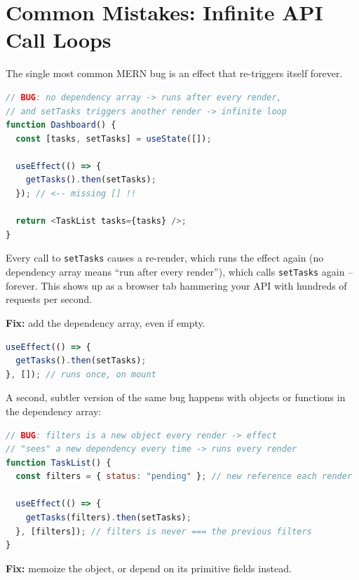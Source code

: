 \section{Common Mistakes: Infinite API Call Loops}

The single most common MERN bug is an effect that re-triggers itself forever.

\begin{warnbox}
\begin{lstlisting}[language=JavaScript]
// BUG: no dependency array -> runs after every render,
// and setTasks triggers another render -> infinite loop
function Dashboard() {
  const [tasks, setTasks] = useState([]);

  useEffect(() => {
    getTasks().then(setTasks);
  }); // <-- missing [] !!

  return <TaskList tasks={tasks} />;
}
\end{lstlisting}
Every call to \texttt{setTasks} causes a re-render, which runs the effect again
(no dependency array means ``run after every render''), which calls
\texttt{setTasks} again -- forever. This shows up as a browser tab hammering
your API with hundreds of requests per second.
\end{warnbox}

\textbf{Fix:} add the dependency array, even if empty.

\begin{lstlisting}[language=JavaScript]
useEffect(() => {
  getTasks().then(setTasks);
}, []); // runs once, on mount
\end{lstlisting}

A second, subtler version of the same bug happens with objects or functions
in the dependency array:

\begin{warnbox}
\begin{lstlisting}[language=JavaScript]
// BUG: filters is a new object every render -> effect
// "sees" a new dependency every time -> runs every render
function TaskList() {
  const filters = { status: "pending" }; // new reference each render

  useEffect(() => {
    getTasks(filters).then(setTasks);
  }, [filters]); // filters is never === the previous filters
}
\end{lstlisting}
\end{warnbox}

\textbf{Fix:} memoize the object, or depend on its primitive fields instead.


